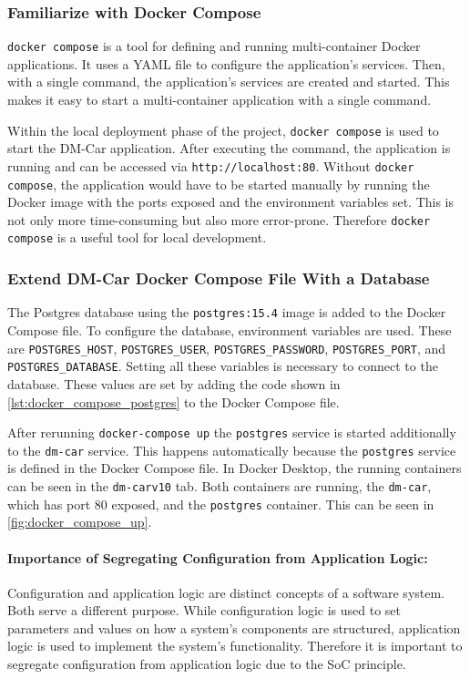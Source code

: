 \subsubsection*{Familiarize with Docker Compose}
\texttt{docker compose} is a tool for defining and running multi-container Docker applications.
It uses a YAML file to configure the application's services.
Then, with a single command, the application's services are created and started.
This makes it easy to start a multi-container application with a single command.

Within the local deployment phase of the project, \texttt{docker compose} is used to start the DM-Car application.
After executing the command, the application is running and can be accessed via \texttt{http://localhost:80}.
Without \texttt{docker compose}, the application would have to be started manually by running the Docker image with the ports exposed and the environment variables set.
This is not only more time-consuming but also more error-prone.
Therefore \texttt{docker compose} is a useful tool for local development.

\subsubsection*{Extend DM-Car Docker Compose File With a Database}
The Postgres database using the \texttt{postgres:15.4} image is added to the Docker Compose file.
To configure the database, environment variables are used.
These are \texttt{POSTGRES\_HOST}, \texttt{POSTGRES\_USER}, \texttt{POSTGRES\_PASSWORD}, \texttt{POSTGRES\_PORT}, and \texttt{POSTGRES\_DATABASE}.
Setting all these variables is necessary to connect to the database.
These values are set by adding the code shown in \autoref*{lst:docker_compose_postgres} to the Docker Compose file.

After rerunning \texttt{docker-compose up} the \texttt{postgres} service is started additionally to the \texttt{dm-car} service.
This happens automatically because the \texttt{postgres} service is defined in the Docker Compose file.
In Docker Desktop, the running containers can be seen in the \texttt{dm-carv10} tab.
Both containers are running, the \texttt{dm-car}, which has port 80 exposed, and the \texttt{postgres} container.
This can be seen in \autoref*{fig:docker_compose_up}.

\paragraph*{Importance of Segregating Configuration from Application Logic:}
Configuration and application logic are distinct concepts of a software system.
Both serve a different purpose.
While configuration logic is used to set parameters and values on how a system's components are structured, application logic is used to implement the system's functionality.
Therefore it is important to segregate configuration from application logic due to the SoC principle.

